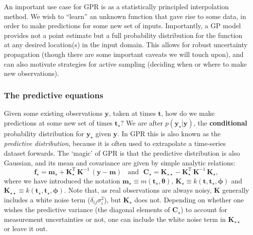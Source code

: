 \documentclass[letterpaper]{ar-1col}
\newcommand{\hyperparams}{\ensuremath{\boldsymbol{\phi}}}
\newcommand{\meanparams}{\ensuremath{\boldsymbol{\theta}}}
\begin{document}
An important use case for GPR is as a statistically principled interpolation method. We wish to ``learn'' an unknown function that gave rise to some data, in order to make predictions for some new set of inputs. Importantly, a GP model provides not a point estimate but a full probability distribution for the function at any desired location(s) in the input domain. This allows for robust uncertainty propagation (though there are some important caveats we will touch upon), and can also motivate strategies for active sampling (deciding when or where to make new observations).

\subsubsection{The predictive equations}

Given some existing observations $\mathbf{y}$, taken at times $\mathbf{t}$, how do we make predictions at some new set of times $\mathbf{t}_\star$? We are after $p(\mathbf{y}_\star|\mathbf{y})$, the \textbf{conditional} probability distribution for $\mathbf{y}_\star$ given $\mathbf{y}$. In GPR this is also known as the \emph{predictive distribution}, because it is often used to extrapolate a time-series dataset forwards. The `magic' of GPR is that the predictive distribution is also Gaussian, and its mean and covariance are given by simple analytic relations:
\begin{equation}
  \label{eq:pred}
  \mathbf{f}_\star = \mathbf{m}_\star + \mathbf{K}_\star^{\mathrm{T}} \, \mathbf{K}^{-1} \, (\mathbf{y} - \mathbf{m}) ~\mathrm{~~~and~~~}
  \mathbf{C}_\star =   \mathbf{K}_{\star\star} - \mathbf{K}_\star^{\mathrm{T}} \, \mathbf{K}^{-1} \, \mathbf{K}_\star,
\end{equation}
where we have introduced the notation $\mathbf{m}_\star \equiv m(\mathbf{t}_\star,\meanparams)$, $\mathbf{K}_\star \equiv k(\mathbf{t},\mathbf{t}_\star, \hyperparams)$ and
$\mathbf{K}_{\star\star} \equiv k(\mathbf{t}_\star,\mathbf{t}_\star,\hyperparams)$. Note that, as real observations are always noisy, $\mathbf{K}$ generally includes a white noise term ($\delta_{ij} \sigma^2_i$), but $\mathbf{K}_\star$ does not. Depending on whether one wishes the predictive variance (the diagonal elements of $\mathbf{C}_\star$)  to account for measurement uncertainties or not, one can include the white noise term in $\mathbf{K}_{\star\star}$ or leave it out.
\end{document}
